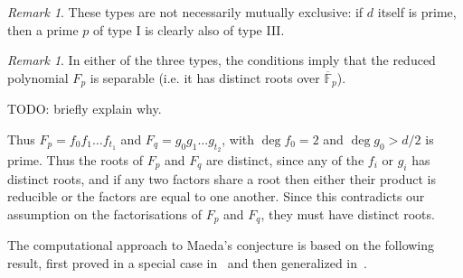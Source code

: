 \documentclass[11pt]{article}
\theoremstyle{plain}
\theoremstyle{definition}
\theoremstyle{remark}
\newtheorem{remark}[theorem]{Remark}
\numberwithin{equation}{section}
\numberwithin{table}{section}
\newcommand{\FF}{\mathbb{F}}
\begin{document}
\begin{remark}
These types are not necessarily mutually exclusive: if $d$ itself is
prime, then a prime $p$ of type I is clearly also of type III.
\end{remark}

\begin{remark}
In either of the three types, the conditions imply that the reduced polynomial
$F_p$ is separable (i.e. it has distinct roots over $\overline{\FF}_p$).

TODO: briefly explain why.
  
Thus $F_p = f_0 f_1 \ldots f_{t_1}$ and
  $F_q = g_0 g_1 \ldots g_{t_2}$, with $\deg f_0 = 2$ and $\deg g_0 > d/2$ is prime.
  Thus the roots of $F_p$ and $F_q$ are distinct, since any of the $f_i$ or $g_i$ has
  distinct roots, and if any two factors share a root then either their product is
  reducible or the factors are equal to one another. Since this contradicts our
  assumption on the factorisations of $F_p$ and $F_q$, they must have distinct roots.
\end{remark}

The computational approach to Maeda's conjecture is based on the following
result, first proved in a special case in~\cite{Buzzard} and then generalized
in~\cite{ConreyFarmer}.
\end{document}
